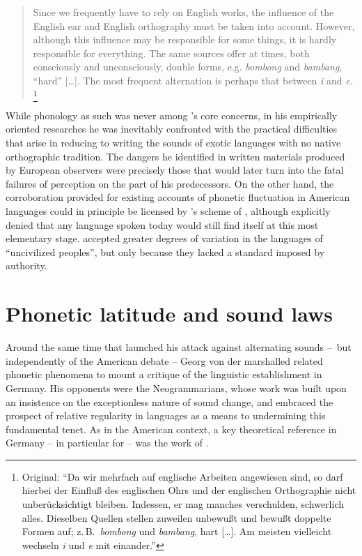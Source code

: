 \documentclass[output=paper]{langscibook}
\begin{document}
\begin{quotation}
Since we frequently have to rely on English works, the influence of the English ear and English orthography must be taken into account. However, although this influence may be responsible for some things, it is hardly responsible for everything. The same sources offer at times, both consciously and unconsciously, double forms, e.g. \emph{bombong} and \emph{bambang}, ``hard'' […]. The most frequent alternation is perhaps that between \emph{i} and \emph{e}. \citep[9]{Steinthal1867}\footnote{Original: ``Da wir mehrfach auf englische Arbeiten angewiesen sind, so darf hierbei der Einfluß des englischen Ohrs und der englischen Orthographie nicht unberücksichtigt bleiben. Indessen, er mag manches verschulden, schwerlich alles. Dieselben Quellen stellen zuweilen unbewußt und bewußt doppelte Formen auf; z.\,B.\ \emph{bombong} und \emph{bambang}, hart […]. Am meisten vielleicht wechseln \emph{i} und \emph{e} mit einander.''}
\end{quotation}

While phonology as such was never among {\Steinthal}'s core concerns, in his empirically oriented researches he was inevitably confronted with the practical difficulties that arise in reducing to writing the sounds of exotic languages with no native orthographic tradition. The dangers he identified in written materials produced by European observers were precisely those that {\Boas} would later turn into the fatal failures of perception on the part of his predecessors. On the other hand, the corroboration {\Brinton} provided for existing accounts of phonetic fluctuation in American languages could in principle be licensed by {\Steinthal}'s scheme of , although {\Steinthal} explicitly denied that any language spoken today would still find itself at this most elementary stage. {\Steinthal} accepted greater degrees of variation in the languages of ``uncivilized peoples'', but only because they lacked a standard imposed by authority.

\section{Phonetic latitude and sound laws}
\label{sec:mcelvenny:gabelentz}

Around the same time that {\Boas} launched his attack against alternating sounds \mbox{-- but} independently of the American debate -- Georg von der {\Gabelentz} marshalled related phonetic phenomena to mount a critique of the linguistic establishment in Germany. His opponents were the Neogrammarians, whose work was built upon an insistence on the exceptionless nature of sound change, and {\Gabelentz} embraced the prospect of relative regularity in languages as a means to undermining this fundamental {\Neogrammarian} tenet. As in the American context, a key theoretical reference in Germany -- in particular for {\Gabelentz} -- was the work of {\Steinthal}.
\end{document}
